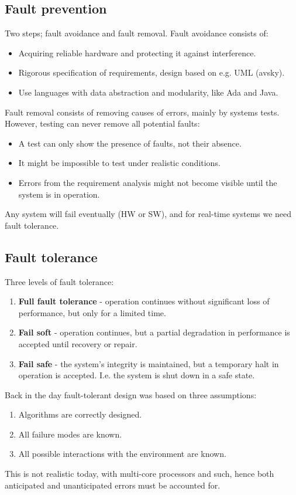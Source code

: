 \subsection{Fault prevention}
Two steps; fault avoidance and fault removal. Fault avoidance consists of:
\begin{itemize}
    \item Acquiring reliable hardware and protecting it against interference.
    \item Rigorous specification of requirements, design based on e.g. UML (avsky).
    \item Use languages with data abstraction and modularity, like Ada and Java.
\end{itemize}
Fault removal consists of removing causes of errors, mainly by systems tests. However, testing can never remove all potential faults:
\begin{itemize}
    \item A test can only show the presence of faults, not their absence.
    \item It might be impossible to test under realistic conditions.
    \item Errors from the requirement analysis might not become visible until the system is in operation.
\end{itemize}
Any system will fail eventually (HW or SW), and for real-time systems we need fault tolerance.

\subsection{Fault tolerance}
Three levels of fault tolerance:
\begin{enumerate}
    \item \textbf{Full fault tolerance} - operation continues without significant loss of performance, but only for a limited time.
    \item \textbf{Fail soft} - operation continues, but a partial degradation in performance is accepted until recovery or repair.
    \item \textbf{Fail safe} - the system's integrity is maintained, but a temporary halt in operation is accepted. I.e. the system is shut down in a safe state. 
\end{enumerate}
Back in the day fault-tolerant design was based on three assumptions:
\begin{enumerate}
    \item Algorithms are correctly designed.
    \item All failure modes are known.
    \item All possible interactions with the environment are known.
\end{enumerate}
This is not realistic today, with multi-core processors and such, hence both anticipated and unanticipated errors must be accounted for.

